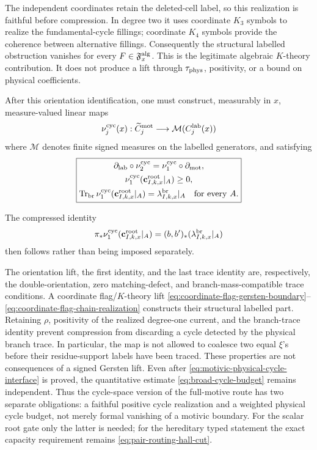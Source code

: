 \documentclass[11pt]{article}
\begin{document}
The independent coordinates retain the deleted-cell label, so this
realization is faithful before compression.  In degree two it uses coordinate
\(K_3\) symbols to realize the fundamental-cycle fillings; coordinate \(K_4\)
symbols provide the coherence between alternative fillings.  Consequently
the structural labelled obstruction vanishes for every
\(F\in\mathfrak F_x^{\rm alg}\).  This is the legitimate algebraic
\(K\)-theory contribution.  It does not produce a lift through
\(\tau_{\rm phys}\), positivity, or a bound on physical coefficients.

After this orientation identification, one must construct, measurably in
\(x\), measure-valued linear maps
\[
 \nu_j^{\rm cyc}(x):
 \widetilde C_j^{\rm mot}\longrightarrow
 \mathcal M(C_j^{\rm lab}(x))
\]
where \(\mathcal M\) denotes finite signed measures on the labelled
generators, and satisfying
\begin{equation}\label{eq:motivic-physical-cycle-interface}
 \boxed{\begin{gathered}
 \partial_{\rm lab}\circ\nu_2^{\rm cyc}
   =\nu_1^{\rm cyc}\circ\partial_{\rm mot},\\
 \nu_1^{\rm cyc}
   (\mathbf c_{I,k,x}^{\rm root}|_A)\ge0,\\
 \operatorname{Tr}_{\rm br}
   \nu_1^{\rm cyc}(\mathbf c_{I,k,x}^{\rm root}|_A)
   =\lambda_{I,k,x}^{\rm br}|_A
 \quad\text{for every }A.
 \end{gathered}}
\end{equation}

The compressed identity
\[
 \pi_\ast\nu_1^{\rm cyc}
   (\mathbf c_{I,k,x}^{\rm root}|_A)
 =(b,b')_\ast(\lambda_{I,k,x}^{\rm br}|_A)
\]
then follows rather than being imposed separately.

The orientation lift, the first identity, and the last trace identity are,
respectively, the double-orientation, zero matching-defect, and
branch-mass-compatible trace conditions.  A coordinate flag/\(K\)-theory lift
\eqref{eq:coordinate-flag-gersten-boundary}--%
\eqref{eq:coordinate-flag-chain-realization} constructs their structural
labelled part.  Retaining \(\rho\), positivity of the realized degree-one
current, and the branch-trace identity prevent compression from
discarding a cycle detected by the physical branch trace.  In particular, the
map is not allowed to coalesce two equal \(\xi\)'s before their residue-support
labels have been traced.  These properties are not consequences of a signed
Gersten lift.  Even after
\eqref{eq:motivic-physical-cycle-interface} is proved, the quantitative
estimate \eqref{eq:broad-cycle-budget} remains independent.  Thus the
cycle-space version of the full-motive route has two separate obligations:
a faithful positive cycle realization and a weighted physical cycle budget,
not merely formal vanishing of a motivic boundary.  For the scalar root gate
only the latter is needed; for the hereditary typed statement the exact
capacity requirement remains \eqref{eq:pair-routing-hall-cut}.
\end{document}
